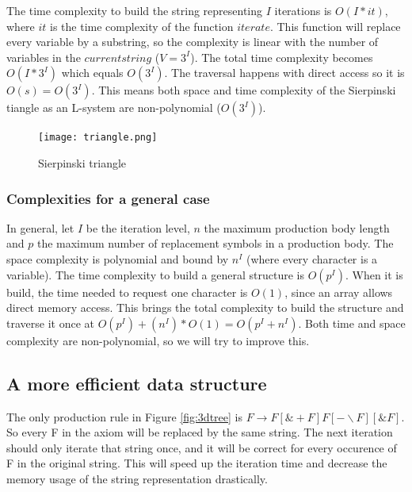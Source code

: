 \documentclass[11pt,a4paper]{article}
\begin{document}
The time complexity to build the string representing $I$ iterations is $O(I * it)$, where $it$ is the time complexity of the function $iterate$. This function will replace every variable by a substring, so the complexity is linear with the number of variables in the $currentstring$ ($V=3^I$). The total time complexity becomes $O(I * 3^I)$ which equals $O(3^I)$. The traversal happens with direct access so it is $O(s)=O(3^I)$. This means both space and time complexity of the Sierpinski tiangle as an L-system are non-polynomial ($O(3^I)$).

\begin{figure}[h!]
  \centering
  \texttt{[image: triangle.png]}
  \caption{Sierpinski triangle}
  \label{fig:triangle}
\end{figure}

\subsubsection{Complexities for a general case}

In general, let $I$ be the iteration level, $n$ the maximum production body length and $p$ the maximum number of replacement symbols in a production body.
The space complexity is polynomial and bound by $n^I$ (where every character is a variable). The time complexity to build a general structure is $O(p^I)$. When it is build, the time needed to request one character is $O(1)$, since an array allows direct memory access. This brings the total complexity to build the structure and traverse it once at $O(p^I) + (n^I)*O(1) = O(p^I+n^I)$.
Both time and space complexity are non-polynomial, so we will try to improve this.

\subsection{A more efficient data structure} %

The only production rule in Figure \ref{fig:3dtree} is $F \rightarrow F[\&+F]F[-\backslash F][\&F]$. So every F in the axiom will be replaced by the same string. The next iteration should only iterate that string once, and it will be correct for every occurence of F in the original string. This will speed up the iteration time and decrease the memory usage of the string representation drastically.
\end{document}
